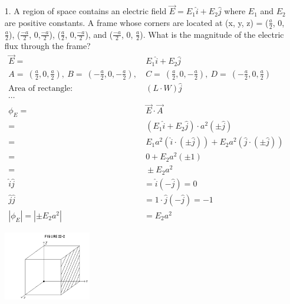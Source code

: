 \documentclass{article}
\begin{document}
\begin{enumerate}
  \item[1.] A region of space contains an electric field \( \overrightarrow{E} = E_1 \widehat{i} + E_2 \widehat{j} \) where \(E_1\) and \(E_2\) are positive constants. A frame whose corners are located at (x, y, z) = (\(\frac{a}{2}\), 0, \(\frac{a}{2}\)), (\(\frac{-a}{2}\), 0,\(\frac{-a}{2}\)), (\(\frac{a}{2}\), 0,\(\frac{-a}{2}\)), and (\(\frac{-a}{2}\), 0, \(\frac{a}{2}\)). What is the magnitude of the electric flux through the frame?
  \begin{align*}
    \overrightarrow{E} =&~E_1\widehat{i} + E_2\widehat{j}\\
    A =~(\frac{a}{2},0,\frac{a}{2}),~B =~(-\frac{a}{2},0,-\frac{a}{2}),&~C =~(\frac{a}{2},0,-\frac{a}{2}),~D =~(-\frac{a}{2},0,\frac{a}{2})\\
    \text{Area of rectangle:}&~(L\cdot{W})\widehat{j}\\
    \cdots \\
    \phi_E =&~\overrightarrow{E}\cdot\overrightarrow{A}\\
           =&~(E_1\widehat{i} + E_2\widehat{j})\cdot{a}^2(\pm \widehat{j})\\
           =&~E_1a^2(\widehat{i}\cdot{(\pm\widehat{j})}) + E_2a^2(\widehat{j}\cdot{(\pm{\widehat{j}})})\\
           =&~0+E_2a^2(\pm{1})\\
           =&~\pm E_2a^2\\
           \widehat{i}\widehat{j} &= \widehat{i}(-\widehat{j}) = 0\\
           \widehat{j}\widehat{j} &= 1\cdot\widehat{j}(-\widehat{j}) = -1\\
           |\phi_E|=|\pm E_2a^2|&=\boxed{E_2a^2}
  \end{align*}
  \item[] \begin{center}\includegraphics[width=0.3\textwidth]{1.png}\end{center}

\end{enumerate}
\end{document}
